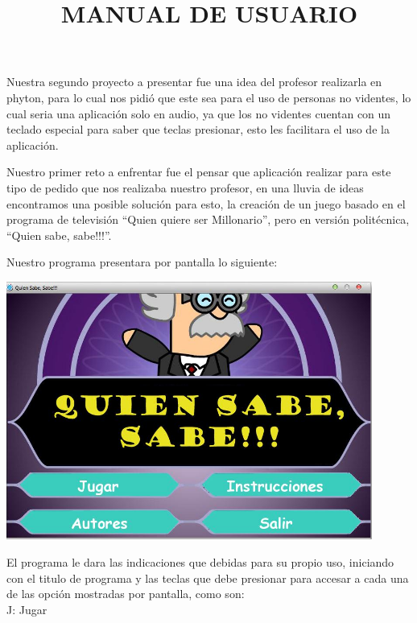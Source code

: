 \documentclass[12pt]{extbook}
\begin{document}
Nuestra segundo proyecto a presentar fue una idea del profesor realizarla
en phyton, para lo cual nos pidió que este sea para el uso de personas
no videntes, lo cual seria una aplicación solo en audio, ya que los
no videntes cuentan con un teclado especial para saber que teclas
presionar, esto les facilitara el uso de la aplicación. 

Nuestro primer reto a enfrentar fue el pensar que aplicación realizar
para este tipo de pedido que nos realizaba nuestro profesor, en una
lluvia de ideas encontramos una posible solución para esto, la creación
de un juego basado en el programa de televisión \textquotedblleft{}Quien
quiere ser Millonario\textquotedblright{}, pero en versión politécnica,
\textquotedblleft{}Quien sabe, sabe!!!\textquotedblright{}. 
\newpage
\begin{center}
\title{MANUAL DE USUARIO}\maketitle
\end{center}

Nuestro programa presentara por pantalla lo siguiente:\\

\begin{center}
\includegraphics[width=12cm]{principal1.jpg}
\end{center}

El programa le dara las indicaciones que debidas para su propio uso,
iniciando con el titulo de programa y las teclas que debe presionar
para accesar a cada una de las opción mostradas por pantalla, como
son:\\

J: Jugar\\
\end{document}
